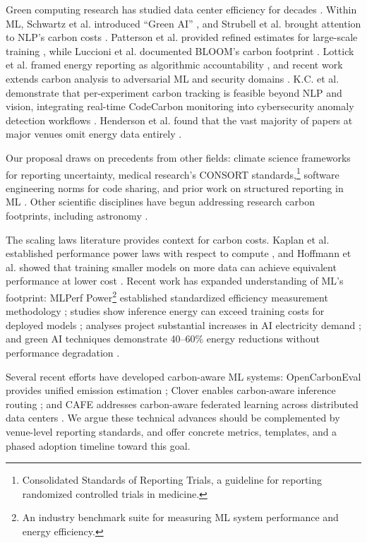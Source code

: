 \documentclass{article}
\theoremstyle{plain}
\theoremstyle{definition}
\theoremstyle{remark}
\begin{document}
Green computing research has studied data center efficiency for decades \cite{masanet2020recalibrating}. Within ML, Schwartz et al. introduced ``Green AI'' \cite{schwartz2020green}, and Strubell et al. brought attention to NLP's carbon costs \cite{strubell2019energy}. Patterson et al. provided refined estimates for large-scale training \cite{patterson2021carbon}, while Luccioni et al. documented BLOOM's carbon footprint \cite{luccioni2023estimating}. Lottick et al. framed energy reporting as algorithmic accountability \cite{lottick2019energy}, and recent work extends carbon analysis to adversarial ML and security domains \cite{hasan2024sustainable}. K.C. et al. demonstrate that per-experiment carbon tracking is feasible beyond NLP and vision, integrating real-time CodeCarbon monitoring into cybersecurity anomaly detection workflows \cite{kc2025ecofriendly}. Henderson et al. found that the vast majority of papers at major venues omit energy data entirely \cite{henderson2020towards}.

Our proposal draws on precedents from other fields: climate science frameworks for reporting uncertainty, medical research's CONSORT standards,\footnote{Consolidated Standards of Reporting Trials, a guideline for reporting randomized controlled trials in medicine.} software engineering norms for code sharing, and prior work on structured reporting in ML \cite{dodge2019show}. Other scientific disciplines have begun addressing research carbon footprints, including astronomy \cite{knodlseder2022astronomy}.

The scaling laws literature provides context for carbon costs. Kaplan et al. established performance power laws with respect to compute \cite{kaplan2020scaling}, and Hoffmann et al. showed that training smaller models on more data can achieve equivalent performance at lower cost \cite{hoffmann2022training}. Recent work has expanded understanding of ML's footprint: MLPerf Power\footnote{An industry benchmark suite for measuring ML system performance and energy efficiency.} established standardized efficiency measurement methodology \cite{tschand2025mlperf}; studies show inference energy can exceed training costs for deployed models \cite{jegham2025hungry,fernandez2025energy}; analyses project substantial increases in AI electricity demand \cite{xiao2025environmental}; and green AI techniques demonstrate 40--60\% energy reductions without performance degradation \cite{verdecchia2025green}.

Several recent efforts have developed carbon-aware ML systems: OpenCarbonEval provides unified emission estimation \cite{yu2024opencarboneval}; Clover enables carbon-aware inference routing \cite{li2023clover}; and CAFE addresses carbon-aware federated learning across distributed data centers \cite{bian2023cafe}. We argue these technical advances should be complemented by venue-level reporting standards, and offer concrete metrics, templates, and a phased adoption timeline toward this goal.
\end{document}
